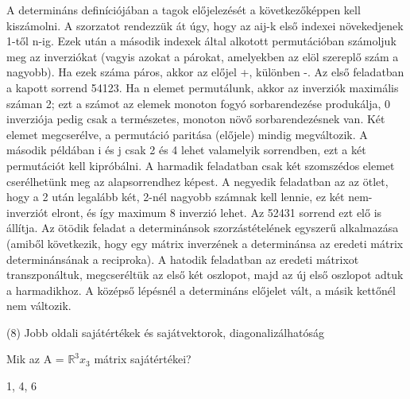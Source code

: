 \begin{frame}
  \begin{tcolorbox}[title={7/6. {\symrook}}]
    A determináns definíciójában a tagok előjelezését a következőképpen kell kiszámolni. A szorzatot rendezzük át úgy, hogy az aij-k első indexei növekedjenek 1-től n-ig. Ezek után a második indexek által alkotott permutációban számoljuk meg az inverziókat (vagyis azokat a párokat, amelyekben az elöl szereplő szám a nagyobb). Ha ezek száma páros, akkor az előjel +, különben -. Az első feladatban a kapott sorrend 54123. Ha n elemet permutálunk, akkor az inverziók maximális száman 2; ezt a számot az elemek monoton fogyó sorbarendezése produkálja, 0 inverziója pedig csak a természetes, monoton növő sorbarendezésnek van. Két elemet megcserélve, a permutáció paritása (előjele) mindig megváltozik. A második példában i és j csak 2 és 4 lehet valamelyik sorrendben, ezt a két permutációt kell kipróbálni. A harmadik feladatban csak két szomszédos elemet cserélhetünk meg az alapsorrendhez képest. A negyedik feladatban az az ötlet, hogy a 2 után legalább két, 2-nél nagyobb számnak kell lennie, ez két nem-inverziót elront, és így maximum 8 inverzió lehet. Az 52431 sorrend ezt elő is állítja. Az ötödik feladat a determinánsok szorzástételének egyszerű alkalmazása (amiből következik, hogy egy mátrix inverzének a determinánsa az eredeti mátrix determinánsának a reciproka). A hatodik feladatban az eredeti mátrixot transzponáltuk, megcseréltük az első két oszlopot, majd az új első oszlopot adtuk a harmadikhoz. A középső lépésnél a determináns előjelet vált, a másik kettőnél nem változik.

  \end{tcolorbox}
\end{frame}


\begin{frame}[plain]
\begin{tcolorbox}[center, colback={myyellow}, coltext={black}, colframe={myyellow}]
    {\RHuge  (8) Jobb oldali sajátértékek és sajátvektorok, diagonalizálhatóság}
    \mmedskip
\end{tcolorbox}
\end{frame}

\begin{frame}
  \begin{tcolorbox}[title={8/1. {\symknight}}]
    Mik az A = $\mathbb{R}^3x_3$ mátrix sajátértékei? 

  \tcblower

    \mmedskip 
    
    1, 4, 6
  \end{tcolorbox}
\end{frame}


